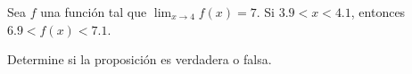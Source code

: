 \item Sea $f$ una función tal que $\lim_{x \to 4} f(x) = 7$. Si $3.9 < x < 4.1$, entonces $6.9 < f(x) < 7.1$.
\par
Determine si la proposición es verdadera o falsa.
